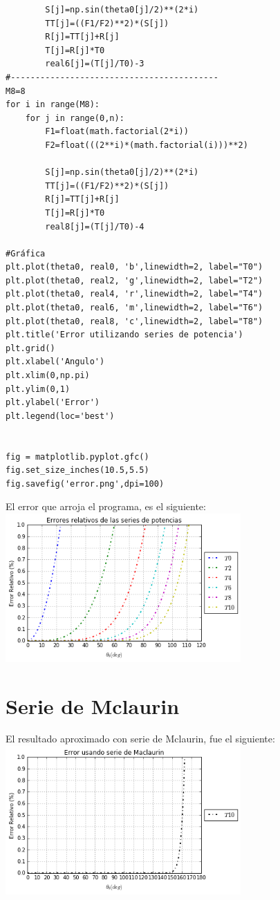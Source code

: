 \documentclass[a4paper]{article}
\begin{document}
\begin{verbatim}
        S[j]=np.sin(theta0[j]/2)**(2*i)
        TT[j]=((F1/F2)**2)*(S[j])
        R[j]=TT[j]+R[j]
        T[j]=R[j]*T0
        real6[j]=(T[j]/T0)-3
#------------------------------------------
M8=8
for i in range(M8):
    for j in range(0,n):
        F1=float(math.factorial(2*i))
        F2=float(((2**i)*(math.factorial(i)))**2)
        
        S[j]=np.sin(theta0[j]/2)**(2*i)
        TT[j]=((F1/F2)**2)*(S[j])
        R[j]=TT[j]+R[j]
        T[j]=R[j]*T0
        real8[j]=(T[j]/T0)-4

#Gráfica
plt.plot(theta0, real0, 'b',linewidth=2, label="T0")
plt.plot(theta0, real2, 'g',linewidth=2, label="T2")
plt.plot(theta0, real4, 'r',linewidth=2, label="T4")
plt.plot(theta0, real6, 'm',linewidth=2, label="T6")
plt.plot(theta0, real8, 'c',linewidth=2, label="T8")
plt.title('Error utilizando series de potencia')
plt.grid()
plt.xlabel('Angulo')
plt.xlim(0,np.pi)
plt.ylim(0,1)
plt.ylabel('Error')
plt.legend(loc='best')


fig = matplotlib.pyplot.gfc()
fig.set_size_inches(10.5,5.5)
fig.savefig('error.png',dpi=100)
\end{verbatim}
El error que arroja el programa, es el siguiente:
\linebreak
\includegraphics[width=9cm]{actividad_9} \\
\section{Serie de Mclaurin}
El resultado aproximado con serie de Mclaurin, fue el siguiente:
\linebreak
\includegraphics[width=9cm]{actividad_9-1}
\end{document}
